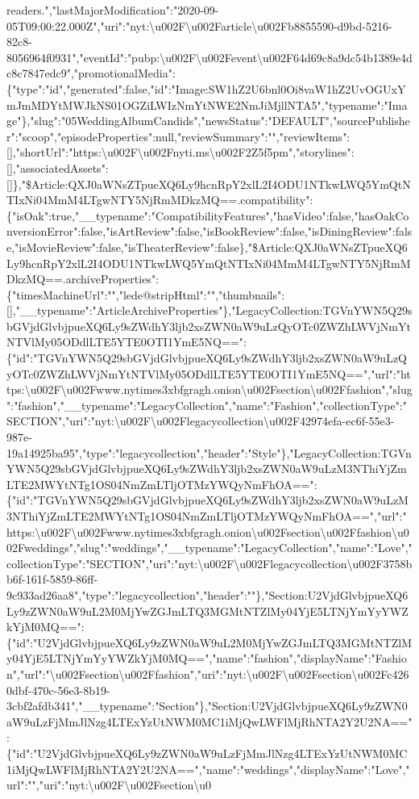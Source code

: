 readers.","lastMajorModification":"2020-09-05T09:00:22.000Z","uri":"nyt:\textbackslash{}u002F\textbackslash{}u002Farticle\textbackslash{}u002Fb8855590-d9bd-5216-82c8-8056964f0931","eventId":"pubp:\textbackslash{}u002F\textbackslash{}u002Fevent\textbackslash{}u002F64d69c8a9dc54b1389e4dc8c7847edc9","promotionalMedia":\{"type":"id","generated":false,"id":"Image:SW1hZ2U6bnl0Oi8vaW1hZ2UvOGUxYmJmMDYtMWJkNS01OGZiLWIzNmYtNWE2NmJiMjllNTA5","typename":"Image"\},"slug":"05WeddingAlbumCandids","newsStatus":"DEFAULT","sourcePublisher":"scoop","episodeProperties":null,"reviewSummary":"","reviewItems":{[}{]},"shortUrl":"https:\textbackslash{}u002F\textbackslash{}u002Fnyti.ms\textbackslash{}u002F2Z5f5pm","storylines":{[}{]},"associatedAssets":{[}{]}\},"\$Article:QXJ0aWNsZTpueXQ6Ly9hcnRpY2xlL2I4ODU1NTkwLWQ5YmQtNTIxNi04MmM4LTgwNTY5NjRmMDkzMQ==.compatibility":\{"isOak":true,"\_\_typename":"CompatibilityFeatures","hasVideo":false,"hasOakConversionError":false,"isArtReview":false,"isBookReview":false,"isDiningReview":false,"isMovieReview":false,"isTheaterReview":false\},"\$Article:QXJ0aWNsZTpueXQ6Ly9hcnRpY2xlL2I4ODU1NTkwLWQ5YmQtNTIxNi04MmM4LTgwNTY5NjRmMDkzMQ==.archiveProperties":\{"timesMachineUrl":"","lede@stripHtml":"","thumbnails":{[}{]},"\_\_typename":"ArticleArchiveProperties"\},"LegacyCollection:TGVnYWN5Q29sbGVjdGlvbjpueXQ6Ly9sZWdhY3ljb2xsZWN0aW9uLzQyOTc0ZWZhLWVjNmYtNTVlMy05ODdlLTE5YTE0OTI1YmE5NQ==":\{"id":"TGVnYWN5Q29sbGVjdGlvbjpueXQ6Ly9sZWdhY3ljb2xsZWN0aW9uLzQyOTc0ZWZhLWVjNmYtNTVlMy05ODdlLTE5YTE0OTI1YmE5NQ==","url":"https:\textbackslash{}u002F\textbackslash{}u002Fwww.nytimes3xbfgragh.onion\textbackslash{}u002Fsection\textbackslash{}u002Ffashion","slug":"fashion","\_\_typename":"LegacyCollection","name":"Fashion","collectionType":"SECTION","uri":"nyt:\textbackslash{}u002F\textbackslash{}u002Flegacycollection\textbackslash{}u002F42974efa-ec6f-55e3-987e-19a14925ba95","type":"legacycollection","header":"Style"\},"LegacyCollection:TGVnYWN5Q29sbGVjdGlvbjpueXQ6Ly9sZWdhY3ljb2xsZWN0aW9uLzM3NThiYjZmLTE2MWYtNTg1OS04NmZmLTljOTMzYWQyNmFhOA==":\{"id":"TGVnYWN5Q29sbGVjdGlvbjpueXQ6Ly9sZWdhY3ljb2xsZWN0aW9uLzM3NThiYjZmLTE2MWYtNTg1OS04NmZmLTljOTMzYWQyNmFhOA==","url":"https:\textbackslash{}u002F\textbackslash{}u002Fwww.nytimes3xbfgragh.onion\textbackslash{}u002Fsection\textbackslash{}u002Ffashion\textbackslash{}u002Fweddings","slug":"weddings","\_\_typename":"LegacyCollection","name":"Love","collectionType":"SECTION","uri":"nyt:\textbackslash{}u002F\textbackslash{}u002Flegacycollection\textbackslash{}u002F3758bb6f-161f-5859-86ff-9c933ad26aa8","type":"legacycollection","header":""\},"Section:U2VjdGlvbjpueXQ6Ly9zZWN0aW9uL2M0MjYwZGJmLTQ3MGMtNTZlMy04YjE5LTNjYmYyYWZkYjM0MQ==":\{"id":"U2VjdGlvbjpueXQ6Ly9zZWN0aW9uL2M0MjYwZGJmLTQ3MGMtNTZlMy04YjE5LTNjYmYyYWZkYjM0MQ==","name":"fashion","displayName":"Fashion","url":"\textbackslash{}u002Fsection\textbackslash{}u002Ffashion","uri":"nyt:\textbackslash{}u002F\textbackslash{}u002Fsection\textbackslash{}u002Fc4260dbf-470c-56e3-8b19-3cbf2afdb341","\_\_typename":"Section"\},"Section:U2VjdGlvbjpueXQ6Ly9zZWN0aW9uLzFjMmJlNzg4LTExYzUtNWM0MC1iMjQwLWFlMjRhNTA2Y2U2NA==":\{"id":"U2VjdGlvbjpueXQ6Ly9zZWN0aW9uLzFjMmJlNzg4LTExYzUtNWM0MC1iMjQwLWFlMjRhNTA2Y2U2NA==","name":"weddings","displayName":"Love","url":"","uri":"nyt:\textbackslash{}u002F\textbackslash{}u002Fsection\textbackslash{}u0